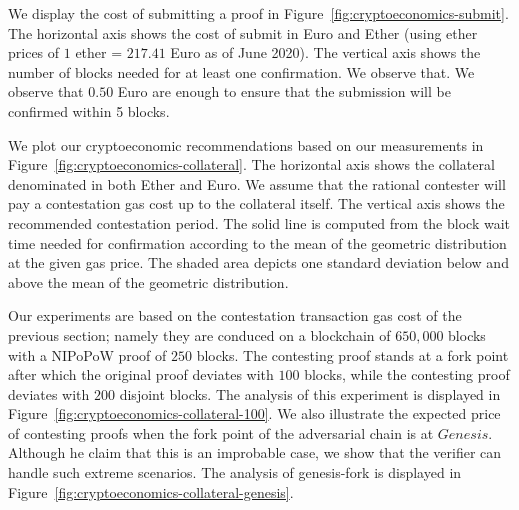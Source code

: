 We display the cost of submitting a proof in
Figure~\ref{fig:cryptoeconomics-submit}. The horizontal axis shows the cost of
submit in Euro and Ether (using ether prices of $1$ ether = $217.41$
Euro as of June 2020). The vertical axis shows the number of blocks needed for
at least one confirmation. We observe that. We observe that $0.50$ Euro are
enough to ensure that the submission will be confirmed within 5 blocks.

We plot our cryptoeconomic recommendations based on our measurements in
Figure~\ref{fig:cryptoeconomics-collateral}. The horizontal axis shows the
collateral denominated in both Ether and Euro.  We assume that the rational
contester will pay a contestation gas cost up to the collateral itself. The
vertical axis shows the recommended contestation period.  The solid line is
computed from the block wait time needed for confirmation according to the mean
of the geometric distribution at the given gas price.  The shaded area depicts
one standard deviation below and above the mean of the geometric distribution.

Our experiments are based on the contestation transaction gas cost of the
previous section; namely they are conduced on a blockchain of $650{,}000$
blocks with a NIPoPoW proof of $250$ blocks. The contesting proof stands at a
fork point after which the original proof deviates with $100$ blocks, while the
contesting proof deviates with $200$ disjoint blocks. The analysis of this
experiment is displayed in Figure~\ref{fig:cryptoeconomics-collateral-100}. We
also illustrate the expected price of contesting proofs when the fork point of
the adversarial chain is at $Genesis$. Although he claim that this is an
improbable case, we show that the verifier can handle such extreme scenarios.
The analysis of genesis-fork is displayed in
Figure~\ref{fig:cryptoeconomics-collateral-genesis}.

